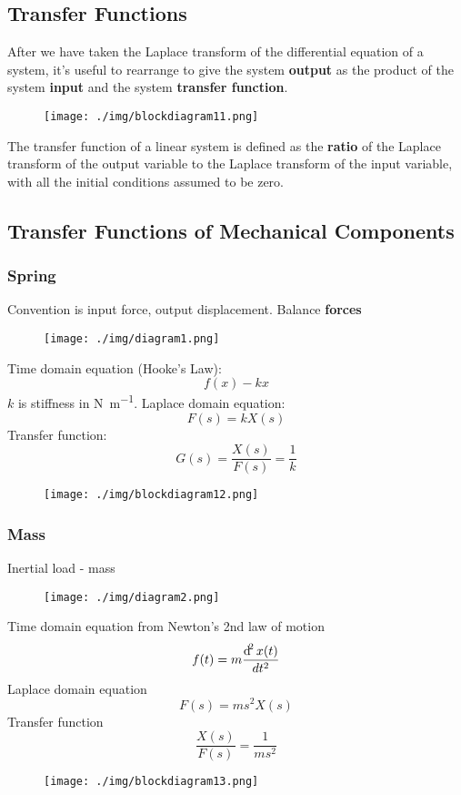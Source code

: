 \subsection{Transfer Functions}
After we have taken the Laplace transform of the differential equation of a system, it's useful to rearrange to give the system \textbf{output} as the product of the system \textbf{input} and the system \textbf{transfer function}.
\begin{figure}[H]
  \centering
  \texttt{[image: ./img/blockdiagram11.png]}
\end{figure}
The transfer function of a linear system is defined as the \textbf{ratio} of the Laplace transform of the output variable to the Laplace transform of the input variable, with all the initial conditions assumed to be zero.
\subsection{Transfer Functions of Mechanical Components}
\subsubsection{Spring}
Convention is input force, output displacement. Balance \textbf{forces}
\begin{figure}[H]
  \centering
  \texttt{[image: ./img/diagram1.png]}
\end{figure}
Time domain equation (Hooke's Law):
\begin{equation}
  f(x) - kx
\end{equation}
$k$ is stiffness in \si{\newton\per\meter}. Laplace domain equation:
\begin{equation}
  F(s) = kX(s)
\end{equation}
Transfer function:
\begin{equation}
  G(s) = \frac{X(s)}{F(s)} = \frac{1}{k}
\end{equation}
\begin{figure}[H]
  \centering
  \texttt{[image: ./img/blockdiagram12.png]}
\end{figure}
\subsubsection{Mass}
Inertial load - mass
\begin{figure}[H]
  \centering
  \texttt{[image: ./img/diagram2.png]}
\end{figure}
Time domain equation from Newton's 2nd law of motion
\begin{equation}
  f(t) = m \frac{\dif^2x(t)}{dt^2}
\end{equation}
Laplace domain equation
\begin{equation}
  F(s) = ms^2 X(s)
\end{equation}
Transfer function
\begin{equation}
  \frac{X(s)}{F(s)} = \frac{1}{ms^2}
\end{equation}
\begin{figure}[H]
  \centering
  \texttt{[image: ./img/blockdiagram13.png]}
\end{figure}
